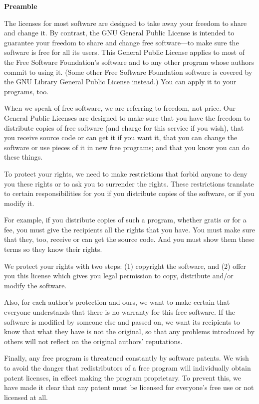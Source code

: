 \documentclass[a4paper,11pt]{book}
\begin{document}
\begin{center}
	{\bf\large Preamble}
\end{center}


The licenses for most software are designed to take away your freedom to
share and change it.  By contrast, the GNU General Public License is
intended to guarantee your freedom to share and change free software---to
make sure the software is free for all its users.  This General Public
License applies to most of the Free Software Foundation's software and to
any other program whose authors commit to using it.  (Some other Free
Software Foundation software is covered by the GNU Library General Public
License instead.)  You can apply it to your programs, too.

When we speak of free software, we are referring to freedom, not price.
Our General Public Licenses are designed to make sure that you have the
freedom to distribute copies of free software (and charge for this service
if you wish), that you receive source code or can get it if you want it,
that you can change the software or use pieces of it in new free programs;
and that you know you can do these things.

To protect your rights, we need to make restrictions that forbid anyone to
deny you these rights or to ask you to surrender the rights.  These
restrictions translate to certain responsibilities for you if you
distribute copies of the software, or if you modify it.

For example, if you distribute copies of such a program, whether gratis or
for a fee, you must give the recipients all the rights that you have.  You
must make sure that they, too, receive or can get the source code.  And
you must show them these terms so they know their rights.

We protect your rights with two steps: (1) copyright the software, and (2)
offer you this license which gives you legal permission to copy,
distribute and/or modify the software.

Also, for each author's protection and ours, we want to make certain that
everyone understands that there is no warranty for this free software.  If
the software is modified by someone else and passed on, we want its
recipients to know that what they have is not the original, so that any
problems introduced by others will not reflect on the original authors'
reputations.

Finally, any free program is threatened constantly by software patents.
We wish to avoid the danger that redistributors of a free program will
individually obtain patent licenses, in effect making the program
proprietary.  To prevent this, we have made it clear that any patent must
be licensed for everyone's free use or not licensed at all.
\end{document}
